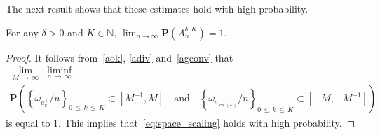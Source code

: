 \documentclass[10pt]{amsart}
\theoremstyle{definition}\newtheorem{defi}[theo]{Definition}\newtheorem{rema}[theo]{Remark}\newtheorem{exam}[theo]{Example}\newtheorem{exem}[theo]{Example}\newtheorem{nota}[theo]{Notation}
\newcommand{\N}{\mathbb N}
\newcommand{\bfP}{\mathbf{P}}
\newcommand\ex{\operatorname{ex}}
\newcommand{\aat}[1]{a_{\ex(#1)}^-}
\begin{document}
The next result shows that these estimates hold with high probability.

\begin{prop}\label{prop:Awhp}
For any $\delta>0$ and $K\in\N$, $\lim_{n\to\infty}\bfP(A^{\delta,K}_n)=1$.
\end{prop}
\begin{proof}
It follows from~\eqref{aok}, \eqref{adiv} and~\eqref{agconv} that
\begin{multline*}
\lim_{M\,\to\,\infty}\;\liminf_{n\,\to\,\infty}\\
\bfP\left(\left\{\omega_{a_k^+}/n\right\}_{0\,\le\,k\,\le\,K} \subset \left[M^{-1}, M\right] \quad\text{and}\quad 
\left\{\omega_{\aat{k}}/n\right\}_{0\,\le\,k \,\le\,K}\subset \left[-M,-M^{-1}\right]\right)
\end{multline*}
is equal to 1. This implies that~\eqref{eq:space_scaling} holds with high probability.


\end{proof}
\end{document}
